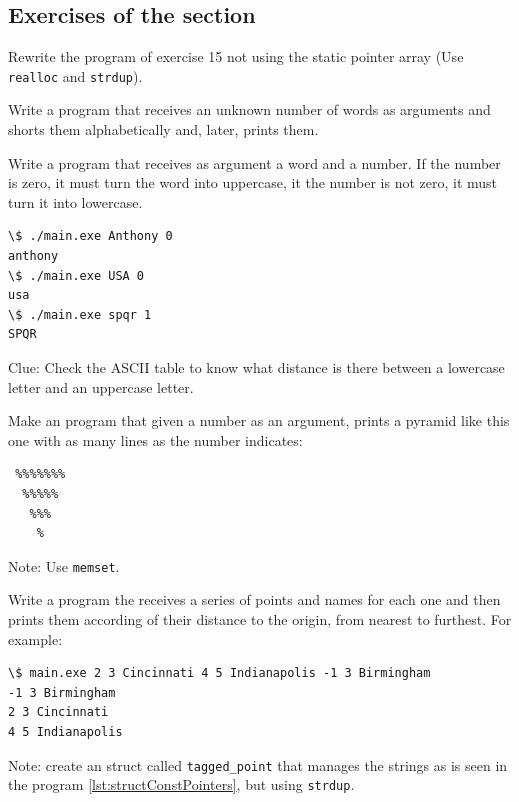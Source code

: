 \documentclass[a4paper]{article}
\begin{document}
\subsection{Exercises of the section}
\begin{exercises}[resume*]
\item Rewrite the program of exercise 15 not using the static pointer array
(Use \verb!realloc! and \verb!strdup!).

\item Write a program that receives an unknown number of words as arguments and
shorts them alphabetically and, later, prints them.
\item Write a program that receives as argument a word and a number. If the
number is zero, it must turn the word into uppercase, it the number is not
zero, it must turn it into lowercase.

\noindent
\begin{minipage}[H]{\linewidth}
\begin{lstlisting}[style=terminalStyle]
\$ ./main.exe Anthony 0
anthony
\$ ./main.exe USA 0
usa
\$ ./main.exe spqr 1
SPQR
\end{lstlisting}
\end{minipage}
Clue: Check the ASCII table to know what distance is there between a lowercase
letter and an uppercase letter.
\item Make an program that given a number as an argument, prints a pyramid like
this one with as many lines as the number indicates:

\noindent
\begin{minipage}[H]{\linewidth}
\begin{lstlisting}[style=terminalStyle]
%%%%%%%%%
 %%%%%%%
  %%%%%
   %%%
    %
\end{lstlisting}
\end{minipage}
Note: Use \verb+memset+.

\item Write a program the receives a series of points and names for each one
and then prints them according of their distance to the origin, from nearest to
furthest. For example:

\noindent
\begin{minipage}[H]{\linewidth}
\begin{lstlisting}[style=terminalStyle]
\$ main.exe 2 3 Cincinnati 4 5 Indianapolis -1 3 Birmingham
-1 3 Birmingham
2 3 Cincinnati
4 5 Indianapolis
\end{lstlisting}
Note: create an struct called \verb!tagged_point! that manages the strings as
is seen in the program
\ref{lst:structConstPointers}, but using \verb!strdup!.
\end{minipage}
\end{exercises}
\end{document}
